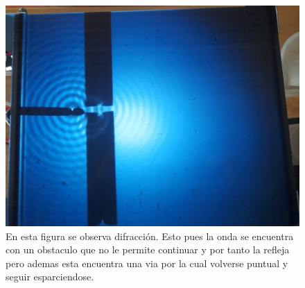 \documentclass[a4paper, amsfonts, amssymb, amsmath, reprint, showkeys, nofootinbib, twoside]{revtex4-1}
\begin{document}
        \begin{figure}[h]
          \centering
          \includegraphics[scale=0.1]{Difraccion.jpeg}
          \caption{En esta figura se observa difracción. Esto pues la onda se encuentra con un obstaculo que no le permite continuar y por tanto la refleja pero ademas esta encuentra una via por la cual volverse puntual y seguir esparciendose.}\label{fig:Difraccion}
        \end{figure}
\end{document}

